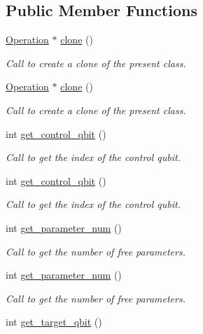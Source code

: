 \subsection*{Public Member Functions}
\begin{DoxyCompactItemize}
\item 
\hyperlink{class_operation}{Operation} $\ast$ \hyperlink{class_operation_a122739dffd4717b337f5e24ac6560f4a}{clone} ()
\begin{DoxyCompactList}\small\item\em Call to create a clone of the present class. \end{DoxyCompactList}\item 
\hyperlink{class_operation}{Operation} $\ast$ \hyperlink{class_operation_afe8d6c0272d173f7157dded83f497b0c}{clone} ()
\begin{DoxyCompactList}\small\item\em Call to create a clone of the present class. \end{DoxyCompactList}\item 
int \hyperlink{class_operation_a2e9b60d334a0e0c99dede014ac989d0a}{get\+\_\+control\+\_\+qbit} ()
\begin{DoxyCompactList}\small\item\em Call to get the index of the control qubit. \end{DoxyCompactList}\item 
int \hyperlink{class_operation_a2e9b60d334a0e0c99dede014ac989d0a}{get\+\_\+control\+\_\+qbit} ()
\begin{DoxyCompactList}\small\item\em Call to get the index of the control qubit. \end{DoxyCompactList}\item 
int \hyperlink{class_operation_a670c1149cd1c675cf67bbcd861817223}{get\+\_\+parameter\+\_\+num} ()
\begin{DoxyCompactList}\small\item\em Call to get the number of free parameters. \end{DoxyCompactList}\item 
int \hyperlink{class_operation_a670c1149cd1c675cf67bbcd861817223}{get\+\_\+parameter\+\_\+num} ()
\begin{DoxyCompactList}\small\item\em Call to get the number of free parameters. \end{DoxyCompactList}\item 
int \hyperlink{class_operation_a55eee2ad4b90be085b1ec2ce018502f8}{get\+\_\+target\+\_\+qbit} ()

\end{DoxyCompactItemize}
